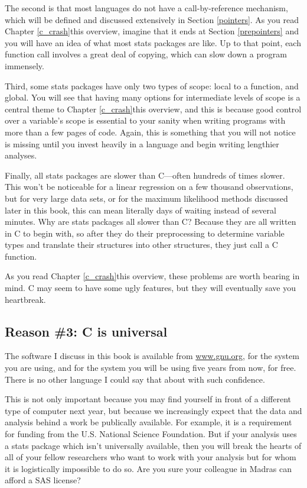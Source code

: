 The second is that most languages do not have a call-by-reference
mechanism, which will be defined and discussed extensively in Section
\ref{pointers}. As you read \ifbook Chapter \ref{c_crash}\else this overview\fi, imagine that it ends
at Section \ref{prepointers} and you will have an idea of what most
stats packages are like. Up to that point, each function call involves a
great deal of copying, which can slow down a program immensely.

Third, some stats packages have only two types of scope: local to
a function, and global. You will see that having many options for
intermediate levels of scope is a central theme to \ifbook Chapter \ref{c_crash}\else this overview\fi,
and this is because good control over a variable's scope is essential
to your sanity when writing programs with more than a few pages of
code. Again, this is something that you will not notice is missing until
you invest heavily in a language and begin writing lengthier analyses.

Finally, all stats packages are slower than C---often hundreds of times
slower. This won't be noticeable for a linear regression on a few thousand
observations, but for very large data sets, or for the maximum likelihood
methods discussed later in this book, this can mean literally days of
waiting instead of several minutes.  Why are stats packages all slower
than C? Because they are all written in C to begin with, so after they
do their preprocessing to determine variable types and translate their
structures into other structures, they just call a C function.

As you read \ifbook Chapter \ref{c_crash}\else this overview\fi, these
problems are worth bearing in mind. C may seem to have some ugly
features, but they will eventually save you heartbreak.

\subsection{Reason \#3: C is universal} 
The software I discuss in this book is available from \url{www.gnu.org}, for the
system you are using, and for the system you will be using five years from now, for
free. There is no other language I could say that about with such confidence.

This is not only important because you may find yourself in front of
a different type of computer next year, but because we increasingly
expect that the data and analysis behind a work be publically available.
For example, it is a requirement for funding from the U.S. National
Science Foundation. But if your analysis uses a stats package which
isn't universally available, then you will break the hearts of all of
your fellow researchers who want to work with your analysis but for whom
it is logistically impossible to do so. Are you sure your colleague in
Madras can afford a SAS license?

